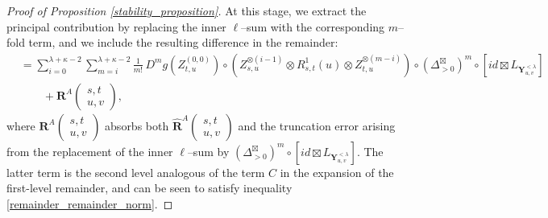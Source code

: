 \documentclass[10pt,a4paper]{amsart}
\begin{document}
\begin{proof}[Proof of Proposition \ref{stability_proposition}]
At this stage, we extract the principal contribution by replacing the inner
$\ell$--sum with the corresponding $m$--fold term, and we include the resulting
difference in the remainder:
\begin{align*}
&=
\sum_{i=0}^{\lambda+\kappa-2}
\sum_{m=i}^{\lambda+\kappa-2}
\frac{1}{m!}\,
D^m g\left(Z^{(0,0)}_{t,u}\right)
\circ
\left(
Z^{\otimes(i-1)}_{s,u}\otimes R^1_{s,t}(u)\otimes Z^{\otimes(m-i)}_{t,u}
\right)
\circ
(\Delta^{\boxtimes}_{>0})^{m}
\circ
\left[id \boxtimes L_{\mathbf{Y}^{<\lambda}_{u,v}}\right]
\\
&\qquad + \mathbf{R}^{A}\begin{pmatrix} s,t \\ u, v \end{pmatrix},
\end{align*}
where $\mathbf{R}^{A}\begin{pmatrix} s,t \\ u, v \end{pmatrix}$ absorbs both
$\hat{\mathbf{R}}^{A}\begin{pmatrix} s,t \\ u, v \end{pmatrix}$ and the truncation error arising from the
replacement of the inner $\ell$--sum by
$(\Delta^{\boxtimes}_{>0})^{m}\circ[id \boxtimes L_{\mathbf{Y}^{<\lambda}_{u,v}}]$. The latter term is the second level analogous of the term $C$ in the expansion of the first-level remainder, and can be seen to satisfy inequality \eqref{remainder_remainder_norm}.


\end{proof}
\end{document}
